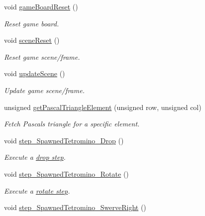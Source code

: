 \begin{DoxyCompactItemize}
\item 
void \hyperlink{classTetreesEngine_ad28ed83be446f74c87d55d79cc64e6ef}{game\+Board\+Reset} ()
\begin{DoxyCompactList}\small\item\em Reset game board. \end{DoxyCompactList}\item 
void \hyperlink{classTetreesEngine_acb719449a68465839ebb0a5e7724cc34}{scene\+Reset} ()
\begin{DoxyCompactList}\small\item\em Reset game scene/frame. \end{DoxyCompactList}\item 
void \hyperlink{classTetreesEngine_a9aa3eec9561623f77eab13298ddad13c}{update\+Scene} ()
\begin{DoxyCompactList}\small\item\em Update game scene/frame. \end{DoxyCompactList}\item 
unsigned \hyperlink{classTetreesEngine_a087f12761b955478bff1d4e70e6c0549}{get\+Pascal\+Triangle\+Element} (unsigned row, unsigned col)
\begin{DoxyCompactList}\small\item\em Fetch Pascal\textquotesingle{}s triangle for a specific element. \end{DoxyCompactList}\item 
void \hyperlink{classTetreesEngine_a626d60fa8adb2dd024016b5cfed4f6ee}{step\+\_\+\+Spawned\+Tetromino\+\_\+\+Drop} ()
\begin{DoxyCompactList}\small\item\em Execute a \hyperlink{TetreesDefs_8hpp_a4d5a793092a473f85b4c1f7faf62afeda6df5f4c213c30a4ad91af7a5d10daa8e}{drop step}. \end{DoxyCompactList}\item 
void \hyperlink{classTetreesEngine_a90d1d65e12fb37850962305d8bc3b7a3}{step\+\_\+\+Spawned\+Tetromino\+\_\+\+Rotate} ()
\begin{DoxyCompactList}\small\item\em Execute a \hyperlink{TetreesDefs_8hpp_a4d5a793092a473f85b4c1f7faf62afeda22387bf41fe41a5ac2b7b74ab8f5c342}{rotate step}. \end{DoxyCompactList}\item 
void \hyperlink{classTetreesEngine_a46e1950877c8b8aa7e988ca3de14ad18}{step\+\_\+\+Spawned\+Tetromino\+\_\+\+Swerve\+Right} ()

\end{DoxyCompactItemize}
